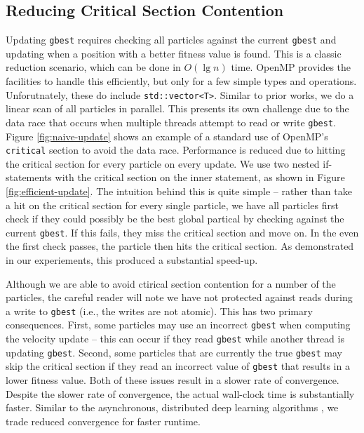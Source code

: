 \subsection{Reducing Critical Section Contention}
Updating \texttt{gbest}
requires checking all particles against the current \texttt{gbest} and updating
when a position with a better fitness value is found. This is a classic
reduction scenario, which can be done in $O(\lg n)$ time. OpenMP provides the
facilities to handle this efficiently, but only for a few simple types and
operations. Unforutnately, these do include \texttt{std::vector<T>}. Similar to
prior works, we do a linear scan of all particles in parallel. This presents its
own challenge due to the data race that occurs when multiple threads attempt to
read or write \texttt{gbest}. Figure \ref{fig:naive-update} shows an example of a
standard use of OpenMP's \texttt{critical} section to avoid the data race.
Performance is reduced due to hitting the critical section for every particle on
every update. We use two nested if-statements
with the critical section on the inner statement, as shown in Figure
\ref{fig:efficient-update}. The intuition behind this is quite simple -- rather
than take a hit on the critical section for every single particle, we
have all particles first check if they could possibly be the best global
partical by checking against the current \texttt{gbest}. If this fails, they
miss the critical section and move on. In the even the first check passes, the
particle then hits the critical section. As demonstrated in our
experiements, this produced a substantial speed-up.

Although we are able to avoid ctirical section contention for a number of the
particles, the careful reader will note we have not protected against reads
during a write to \texttt{gbest} (i.e., the writes are not atomic).
This has two primary
consequences. First, some particles may use an incorrect \texttt{gbest} when
computing the velocity update -- this can occur if they read \texttt{gbest}
while another thread is updating \texttt{gbest}. Second, some particles that are
currently the true \texttt{gbest} may skip the critical section if they read an
incorrect value of \texttt{gbest} that results in a lower fitness value. Both of
these issues result in a slower rate of convergence. Despite the slower rate of convergence,
the actual wall-clock time is substantially faster. Similar to the asynchronous,
distributed deep learning algorithms \cite{adam, downpour}, we trade reduced convergence for
faster runtime.


